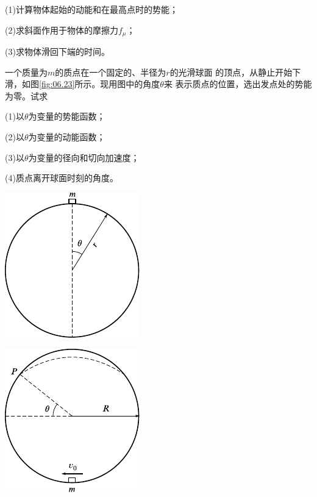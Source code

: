 \begin{exercises}
\clearpage
(1)计算物体起始的动能和在最高点时的势能；

(2)求斜面作用于物体的摩擦力$ f _ { \mu } $；

(3)求物体滑回下端的时间。

\exercise 一个质量为$ m $的质点在一个固定的、半径为$ r $的光滑球面
的顶点，从静止开始下滑，如图\ref{fig:06.23}\;所示。现用图中的角度$ \theta $来
表示质点的位置，选出发点处的势能为零。试求

(1)以$ \theta $为变量的势能函数；

(2)以$ \theta $为变量的动能函数；

(3)以$ \theta $为变量的径向和切向加速度；

(4)质点离开球面时刻的角度。
\vspace{1.56em}
\begin{figurex}
  \begin{minipage}[b]{0.5\linewidth}
    \centering
    \includegraphics{figure/fig06.23}
    \caption{}
    \label{fig:06.23}
  \end{minipage}
  \hfill
  \begin{minipage}[b]{0.5\linewidth}
    \centering
    \includegraphics{figure/fig06.24}
    \caption{}
    \label{fig:06.24}
  \end{minipage}
\end{figurex}


\end{exercises}
